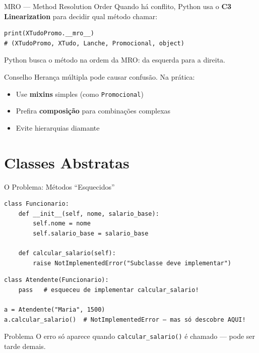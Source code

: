 \documentclass[aspectratio=169]{beamer}
\begin{document}
\begin{frame}[fragile]{MRO — Method Resolution Order}
  Quando há conflito, Python usa o \textbf{C3 Linearization} para decidir qual método chamar:

  \begin{lstlisting}
print(XTudoPromo.__mro__)
# (XTudoPromo, XTudo, Lanche, Promocional, object)
  \end{lstlisting}

  Python busca o método na ordem da MRO: da esquerda para a direita.

  \begin{alertblock}{Conselho}
    Herança múltipla pode causar confusão. Na prática:
    \begin{itemize}
      \item Use \textbf{mixins} simples (como \texttt{Promocional})
      \item Prefira \textbf{composição} para combinações complexas
      \item Evite hierarquias diamante
    \end{itemize}
  \end{alertblock}
\end{frame}

\section{Classes Abstratas}

\begin{frame}{O Problema: Métodos ``Esquecidos''}
  \begin{lstlisting}
class Funcionario:
    def __init__(self, nome, salario_base):
        self.nome = nome
        self.salario_base = salario_base

    def calcular_salario(self):
        raise NotImplementedError("Subclasse deve implementar")
  \end{lstlisting}

  \begin{lstlisting}
class Atendente(Funcionario):
    pass   # esqueceu de implementar calcular_salario!

a = Atendente("Maria", 1500)
a.calcular_salario()  # NotImplementedError — mas só descobre AQUI!
  \end{lstlisting}

  \begin{alertblock}{Problema}
    O erro só aparece quando \texttt{calcular\_salario()} é chamado — pode ser tarde demais.
  \end{alertblock}
\end{frame}
\end{document}
